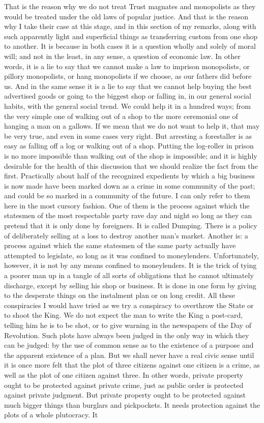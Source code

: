 \documentclass{book}
\begin{document}
That is the reason why we do not treat Trust magnates and monopolists as they would be treated under the old laws of popular justice. And that is the reason why I take their case at this stage, and in this section of my remarks, along with such apparently light and superficial things as transferring custom from one shop to another. It is because in both cases it is a question wholly and solely of moral will; and not in the least, in any sense, a question of economic law. In other words, it is a lie to say that we cannot make a law to imprison monopolists, or pillory monopolists, or hang monopolists if we choose, as our fathers did before us. And in the same sense it is a lie to say that we cannot help buying the best advertised goods or going to the biggest shop or falling in, in our general social habits, with the general social trend. We could help it in a hundred ways; from the very simple one of walking out of a shop to the more ceremonial one of hanging a man on a gallows. If we mean that we do not want to help it, that may be very true, and even in some cases very right. But arresting a forestaller is as easy as falling off a log or walking out of a shop. Putting the log-roller in prison is no more impossible than walking out of the shop is impossible; and it is highly desirable for the health of this discussion that we should realize the fact from the first. Practically about half of the recognized expedients by which a big business is now made have been marked down as a crime in some community of the past; and could be so marked in a community of the future. I can only refer to them here in the most cursory fashion. One of them is the process against which the statesmen of the most respectable party rave day and night so long as they can pretend that it is only done by foreigners. It is called Dumping. There is a policy of deliberately selling at a loss to destroy another man’s market. Another is: a process against which the same statesmen of the same party actually have attempted to legislate, so long as it was confined to moneylenders. Unfortunately, however, it is not by any means confined to moneylenders. It is the trick of tying a poorer man up in a tangle of all sorts of obligations that he cannot ultimately discharge, except by selling his shop or business. It is done in one form by giving to the desperate things on the instalment plan or on long credit. All these conspiracies I would have tried as we try a conspiracy to overthrow the State or to shoot the King. We do not expect the man to write the King a post-card, telling him he is to be shot, or to give warning in the newspapers of the Day of Revolution. Such plots have always been judged in the only way in which they can be judged: by the use of common sense as to the existence of a purpose and the apparent existence of a plan. But we shall never have a real civic sense until it is once more felt that the plot of three citizens against one citizen is a crime, as well as the plot of one citizen against three. In other words, private property ought to be protected against private crime, just as public order is protected against private judgment. But private property ought to be protected against much bigger things than burglars and pickpockets. It needs protection against the plots of a whole plutocracy. It 
\end{document}
